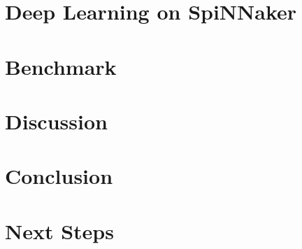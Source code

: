 \documentclass[]{article}
\begin{document}



\section{Deep Learning on SpiNNaker}

\section{Benchmark}

\section{Discussion}

\section{Conclusion}

\section{Next Steps}


\end{document}
